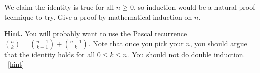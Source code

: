 \documentclass{book}
\begin{document}
\setcounter{project}{73}
\addtocounter{project}{-1}
\begin{activity}[]\label{activity-66}
\hypertarget{p-571}{}%
We claim the identity is true for all \(n \ge 0\), so induction would be a natural proof technique to try.  Give a proof by mathematical induction on \(n\).%
\par\smallskip%
\noindent\textbf{Hint.}\hypertarget{hint-28}{}\quad%
\hypertarget{p-572}{}%
You will probably want to use the Pascal recurrence \(\binom{n}{k} = \binom{n-1}{k-1} + \binom{n-1}{k}\).  Note that once you pick your \(n\), you should argue that the identity holds for all \(0 \le k \le n\).  You should not do double induction.%
~\hfill{\tiny\hyperlink{a-73}{[hint]}\hypertarget{q-73}{}}\end{activity}

\clearpage
\end{document}
